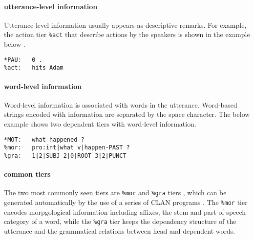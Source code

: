 \paragraph{utterance-level information}
Utterance-level information usually appears as descriptive remarks. For example, the action tier \texttt{\%act} that describe actions by the speakers is shown in the example below .\\

\lstset{
numbers = none,
frame = single,
}

\begin{lstlisting}[caption={Example of a dependent tier with utterance-level information.}, label={lst:chatsent1}]
*PAU:   0 .
%act:   hits Adam
\end{lstlisting}


\paragraph{word-level information}
Word-level information is associated with words in the utterance. Word-based strings encoded with information are separated by the space character. The below example  shows two dependent tiers with word-level information.

\clearpage

\lstset{
numbers = none,
frame = single,
}

\begin{lstlisting}[caption={Example of dependent tiers with word-level information}, label={lst:chatsent2}]
*MOT:   what happened ?
%mor:   pro:int|what v|happen-PAST ?
%gra:   1|2|SUBJ 2|0|ROOT 3|2|PUNCT
\end{lstlisting}

\paragraph{common tiers}
The two most commonly seen tiers are \texttt{\%mor} and \texttt{\%gra} tiers , which can be generated automatically by the use of a series of CLAN programs . The \texttt{\%mor} tier encodes morpgological information including affixes, the stem and part-of-speech category of a word, while the \texttt{\%gra} tier keeps the dependency structure of the utterance and the grammatical relations between head and dependent words.

